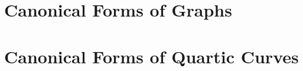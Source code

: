 


\bigskip


\clearpage




\section{Canonical Forms of Graphs}
\label{sec:canonical:form:objects:graphs}





\bigskip


\clearpage



\section{Canonical Forms of Quartic Curves}
\label{sec:canonical:form:objects:quartic:curvs}





\bigskip


\clearpage




